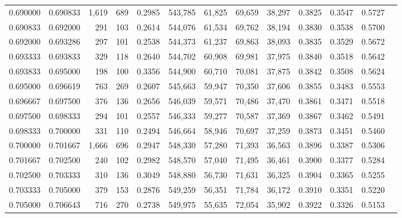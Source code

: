 \begin{tabular}{rrrrrrrrrrrrr}
0.690000 & 0.690833 & 1,619 & 689 &                                     0.2985 & 543,785 &  61,825 &  69,659 &  38,297 & 0.3825 & 0.3547 & 0.5727 \\
0.690833 & 0.692000 &   291 & 103 &                                     0.2614 & 544,076 &  61,534 &  69,762 &  38,194 & 0.3830 & 0.3538 & 0.5700 \\
0.692000 & 0.693286 &   297 & 101 &                                     0.2538 & 544,373 &  61,237 &  69,863 &  38,093 & 0.3835 & 0.3529 & 0.5672 \\
0.693333 & 0.693833 &   329 & 118 &                                     0.2640 & 544,702 &  60,908 &  69,981 &  37,975 & 0.3840 & 0.3518 & 0.5642 \\
0.693833 & 0.695000 &   198 & 100 &                                     0.3356 & 544,900 &  60,710 &  70,081 &  37,875 & 0.3842 & 0.3508 & 0.5624 \\
0.695000 & 0.696619 &   763 & 269 &                                     0.2607 & 545,663 &  59,947 &  70,350 &  37,606 & 0.3855 & 0.3483 & 0.5553 \\
0.696667 & 0.697500 &   376 & 136 &                                     0.2656 & 546,039 &  59,571 &  70,486 &  37,470 & 0.3861 & 0.3471 & 0.5518 \\
0.697500 & 0.698333 &   294 & 101 &                                     0.2557 & 546,333 &  59,277 &  70,587 &  37,369 & 0.3867 & 0.3462 & 0.5491 \\
0.698333 & 0.700000 &   331 & 110 &                                     0.2494 & 546,664 &  58,946 &  70,697 &  37,259 & 0.3873 & 0.3451 & 0.5460 \\
0.700000 & 0.701667 & 1,666 & 696 &                                     0.2947 & 548,330 &  57,280 &  71,393 &  36,563 & 0.3896 & 0.3387 & 0.5306 \\
0.701667 & 0.702500 &   240 & 102 &                                     0.2982 & 548,570 &  57,040 &  71,495 &  36,461 & 0.3900 & 0.3377 & 0.5284 \\
0.702500 & 0.703333 &   310 & 136 &                                     0.3049 & 548,880 &  56,730 &  71,631 &  36,325 & 0.3904 & 0.3365 & 0.5255 \\
0.703333 & 0.705000 &   379 & 153 &                                     0.2876 & 549,259 &  56,351 &  71,784 &  36,172 & 0.3910 & 0.3351 & 0.5220 \\
0.705000 & 0.706643 &   716 & 270 &                                     0.2738 & 549,975 &  55,635 &  72,054 &  35,902 & 0.3922 & 0.3326 & 0.5153 \\

\end{tabular}
